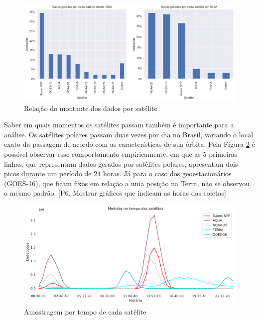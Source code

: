 \documentclass[cic,tc]{iiufrgs}
\begin{document}
\begin{figure}
    \caption{Relação do montante dos dados por satélite}
    \begin{center}
        \includegraphics[width=35em]{porcentagem_satelites}
    \end{center}
    \label{fig:porcentagem_satelites}
\end{figure}

Saber em quais momentos os satélites passam também é importante para a análise. 
Os satélites polares passam duas vezes por dia no Brasil, variando o local 
exato da passagem de acordo com as características de sua órbita. Pela  
Figura \ref{fig:tempo_medidas_satelites} é possível observar esse comportamento 
empiricamente, em que as 5 primeiras linhas, que representam dados gerados por 
satélites polares, apresentam dois picos durante um período de 24 horas. Já para o  
caso dos geoestacionários (GOES-16), que ficam fixos em relação a uma posição 
na Terra, não se observou o mesmo padrão. 
[P6. Mostrar gráficos que indicam as horas das coletas] \par

\begin{figure}
    \caption{Amostragem por tempo de cada satélite}
    \begin{center}
        \includegraphics[width=35em]{tempo_medidas_satelites}
    \end{center}
    \label{fig:tempo_medidas_satelites}
\end{figure}
\end{document}
